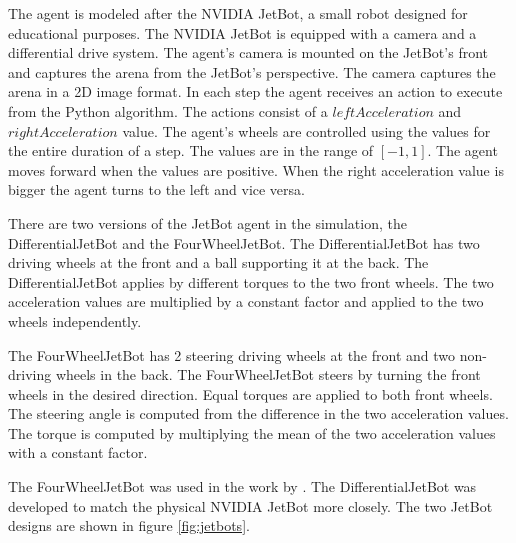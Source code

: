 The agent is modeled after the NVIDIA JetBot, a small robot designed for educational purposes. The NVIDIA JetBot is equipped with a camera and a differential drive system. The agent's camera is mounted on the JetBot's front and captures the arena from the JetBot's perspective. The camera captures the arena in a 2D image format. In each step the agent receives an action to execute from the Python algorithm. The actions consist of a $leftAcceleration$ and $rightAcceleration$ value. The agent's wheels are controlled using the values for the entire duration of a step. 
The values are in the range of $[-1, 1]$. The agent moves forward when the values are positive. When the right acceleration value is bigger the agent turns to the left and vice versa.


There are two versions of the JetBot agent in the simulation, the DifferentialJetBot and the FourWheelJetBot. The DifferentialJetBot has two driving wheels at the front and a ball supporting it at the back. The DifferentialJetBot applies by different torques to the two front wheels. The two acceleration values are multiplied by a constant factor and applied to the two wheels independently.

The FourWheelJetBot has 2 steering driving wheels at the front and two non-driving wheels in the back. The FourWheelJetBot steers by turning the front wheels in the desired direction. Equal torques are applied to both front wheels. The steering angle is computed from the difference in the two acceleration values. The torque is computed by multiplying the mean of the two acceleration values with a constant factor.

The FourWheelJetBot was used in the work by \textcite{maximilian}. The DifferentialJetBot was developed to match the physical NVIDIA JetBot more closely. The two JetBot designs are shown in figure \ref{fig:jetbots}.


